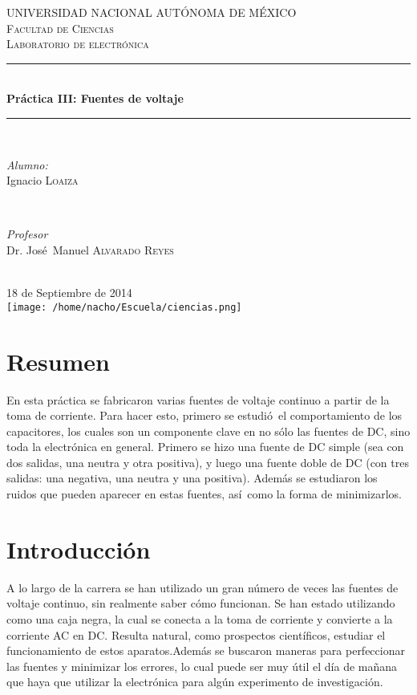 \documentclass[11pt]{article}
\renewcommand{\=}[1]{\stackrel{#1}{=}} %
\theoremstyle{definition}
\theoremstyle{remark}
\begin{document}
\begin{titlepage}
\newcommand{\HRule}{\rule{\linewidth}{0.5mm}}
\center 
 
\textsc{\LARGE UNIVERSIDAD NACIONAL AUT\'ONOMA DE M\'EXICO}\\[1.5cm] 
\textsc{\Large Facultad de Ciencias}\\[0.5cm] 
\textsc{\large Laboratorio de electr\'onica}\\[0.5cm] 
\HRule \\[0.4cm]
{ \huge \bfseries Pr\'actica III: Fuentes de voltaje}\\[0.4cm]
\HRule \\[1.5cm]
\begin{minipage}{0.4\textwidth}
\begin{flushleft} \large
\emph{Alumno:}\\
Ignacio \textsc{Loaiza}
\end{flushleft}
\end{minipage}
~
\begin{minipage}{0.4\textwidth}
\begin{flushright} \large
\emph{Profesor} \\
Dr. Jos\'e\ Manuel \textsc{Alvarado Reyes}
\end{flushright}
\end{minipage}\\[3cm]
{\large 18 de Septiembre de 2014}\\[0.5cm]
\texttt{[image: /home/nacho/Escuela/ciencias.png]}\\[1cm]
\vfill
\end{titlepage}
\section{Resumen}
En esta pr\'actica se fabricaron varias fuentes de voltaje continuo a partir de la toma de corriente. Para hacer esto, primero se estudi\'o\ el comportamiento de los capacitores, los cuales son un componente clave en no s\'olo las fuentes de DC, sino toda la electr\'onica en general. Primero se hizo una fuente de DC simple (sea con dos salidas, una neutra y otra positiva), y luego una fuente doble de DC (con tres salidas: una negativa, una neutra y una positiva). Adem\'as se estudiaron los ruidos que pueden aparecer en estas fuentes, as\'i\ como la forma de minimizarlos.

\section{Introducci\'on}
A lo largo de la carrera se han utilizado un gran n\'umero de veces las fuentes de voltaje continuo, sin realmente saber c\'omo funcionan. Se han estado utilizando como una caja negra, la cual se conecta a la toma de corriente y convierte a la corriente AC en DC. Resulta natural, como prospectos cient\'ificos, estudiar el funcionamiento de estos aparatos.Adem\'as se buscaron maneras para perfeccionar las fuentes y minimizar los errores, lo cual puede ser muy \'util el d\'ia de ma\~nana que haya que utilizar la electr\'onica para alg\'un experimento de investigaci\'on.
\end{document}
